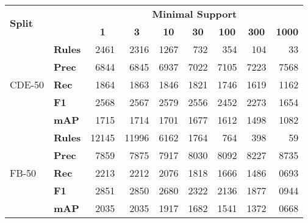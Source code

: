 \begin{tabular}{| l | l | r | r | r | r | r | r | r |}
    \hline

    \multirow{2}{*}{\textbf{Split}} &
    &
    \multicolumn{7}{|c|}{\textbf{Minimal Support}} \\

    &
    &
    \multicolumn{1}{|c|}{\textbf{1}} &
    \multicolumn{1}{|c|}{\textbf{3}} &
    \multicolumn{1}{|c|}{\textbf{10}} &
    \multicolumn{1}{|c|}{\textbf{30}} &
    \multicolumn{1}{|c|}{\textbf{100}} &
    \multicolumn{1}{|c|}{\textbf{300}} &
    \multicolumn{1}{|c|}{\textbf{1000}} \\

    \hline \hline

    \multirow{5}{*}{CDE-50}
    & \textbf{Rules} & \num{2461}  & \num{2316}  & \num{1267} & \num{732}  & \num{354} & \num{104} & \num{33} \\
    & \textbf{Prec}  & 6844        & 6845        & 6937       & 7022       & 7105      & 7223      & 7568     \\
    & \textbf{Rec}   & 1864        & 1863        & 1846       & 1821       & 1746      & 1619      & 1162     \\
    & \textbf{F1}    & 2568        & 2567        & 2579       & 2556       & 2452      & 2273      & 1654     \\
    & \textbf{mAP}   & 1715        & 1714        & 1701       & 1677       & 1612      & 1498      & 1082     \\ \hline

    \multirow{5}{*}{FB-50}
    & \textbf{Rules} & \num{12145} & \num{11996} & \num{6162} & \num{1764} & \num{764} & \num{398} & \num{59} \\
    & \textbf{Prec}  & 7859        & 7875        & 7917       & 8030       & 8092      & 8227      & 8735     \\
    & \textbf{Rec}   & 2213        & 2212        & 2076       & 1818       & 1666      & 1486      & 0693     \\
    & \textbf{F1}    & 2851        & 2850        & 2680       & 2322       & 2136      & 1877      & 0944     \\
    & \textbf{mAP}   & 2035        & 2035        & 1917       & 1682       & 1541      & 1372      & 0668     \\ \hline

\end{tabular}
